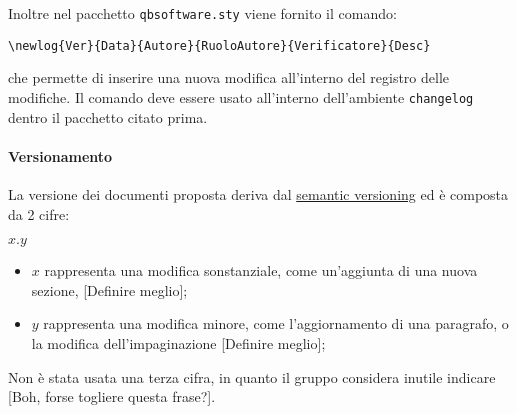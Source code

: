             Inoltre nel pacchetto \verb|qbsoftware.sty| viene fornito il comando:
            \begin{center}
                \verb*|\newlog{Ver}{Data}{Autore}{RuoloAutore}{Verificatore}{Desc}|
            \end{center}
            che permette di inserire una nuova modifica all'interno del registro delle modifiche. Il comando deve essere usato all'interno dell'ambiente \verb|changelog| dentro il pacchetto citato prima.

        \paragraph{Versionamento} \label{sec:doc_versionamento}
            La versione dei documenti proposta deriva dal \href{https://semver.org/}{semantic versioning} ed è composta da 2 cifre:
            \begin{center}
                $x.y$
            \end{center}
            \begin{itemize}
                \item $x$ rappresenta una modifica sonstanziale, come un'aggiunta di una nuova sezione, [Definire meglio];
                \item $y$ rappresenta una modifica minore, come l'aggiornamento di una paragrafo, o la modifica dell'impaginazione [Definire meglio];
            \end{itemize}
            Non è stata usata una terza cifra, in quanto il gruppo considera inutile indicare [Boh, forse togliere questa frase?].


